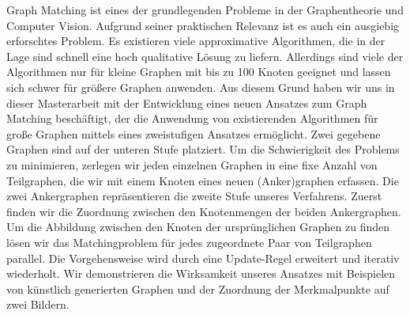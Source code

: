 Graph Matching ist eines der grundlegenden Probleme in der Graphentheorie und Computer Vision. Aufgrund seiner praktischen Relevanz ist es auch ein ausgiebig erforschtes Problem. Es existieren viele approximative Algorithmen, die in der Lage sind schnell eine hoch qualitative Lösung zu liefern. Allerdings sind viele der Algorithmen nur für kleine Graphen mit bis zu 100 Knoten geeignet und lassen sich schwer für größere Graphen anwenden. Aus diesem Grund haben wir uns in dieser Masterarbeit mit der Entwicklung eines neuen Ansatzes zum Graph Matching beschäftigt, der die Anwendung von existierenden Algorithmen für große Graphen mittels eines zweistufigen Ansatzes ermöglicht. Zwei gegebene Graphen sind auf der unteren Stufe platziert. Um die Schwierigkeit des Problems zu minimieren, zerlegen wir jeden einzelnen Graphen in eine fixe Anzahl von Teilgraphen, die wir mit einem Knoten eines neuen (Anker)graphen erfassen. Die zwei Ankergraphen repräsentieren die zweite Stufe unseres Verfahrens. Zuerst finden wir die Zuordnung zwischen den Knotenmengen der beiden Ankergraphen. Um die Abbildung zwischen den Knoten der ursprünglichen Graphen zu finden lösen wir das Matchingproblem  für jedes zugeordnete Paar von Teilgraphen parallel. Die Vorgehensweise wird durch eine Update-Regel erweitert und iterativ wiederholt. Wir demonstrieren die Wirksamkeit unseres Ansatzes mit Beispielen von künstlich generierten Graphen und der Zuordnung der Merkmalpunkte auf zwei Bildern.
